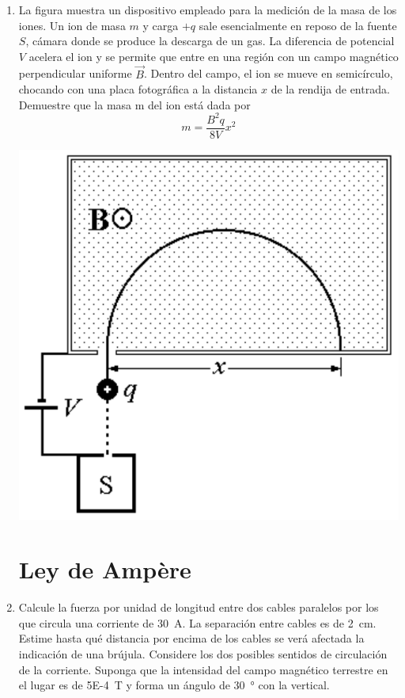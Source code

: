 \documentclass[11pt,spanish,a4paper]{article}
\begin{document}
\begin{enumerate}
  \item \begin{minipage}[t]{0.7\textwidth}
  La figura muestra un dispositivo empleado para la medición de la masa de los iones.
Un ion de masa \(m\) y carga \(+q\) sale esencialmente en reposo de la fuente \(S\), cámara donde se produce la descarga de un gas.
La diferencia de potencial \(V\) acelera el ion y se permite que entre en una región con un campo magnético perpendicular uniforme \(\vec{B}\).
Dentro del campo, el ion se mueve en semicírculo, chocando con una placa fotográfica a la distancia \(x\) de la rendija de entrada.
Demuestre que la masa m del ion está dada por 
\[
  m= \frac{B^2 q}{8 V} x^2
\]
	\end{minipage}
	\begin{minipage}[c][1em][t]{0.25\textwidth}
  		\includegraphics[width=\textwidth]{p4e03}
	\end{minipage}


\section*{Ley de Ampère}

  \item Calcule la fuerza por unidad de longitud entre dos cables paralelos por los que circula una corriente de \SI{30}{A}.
La separación entre cables es de \SI{2}{\centi\metre}.
Estime hasta qué distancia por encima de los cables se verá afectada la indicación de una brújula.
Considere los dos posibles sentidos de circulación de la corriente.
Suponga que la intensidad del campo magnético terrestre en el lugar es de \SI{5E-4}{\tesla} y forma un ángulo de \SI{30}{\degree} con la vertical.



\end{enumerate}
\end{document}
